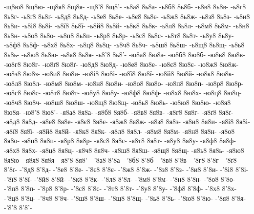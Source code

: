 {-щ8ю8
8щ8ю-
-щ8я8
8щ8я-
-щ8'8
8щ8'-
-ь8а8
8ь8а-
-ь8б8
8ь8б-
-ь8в8
8ь8в-
-ь8г8
8ь8г-
-ь8ґ8
8ь8ґ-
-ь8д8
8ь8д-
-ь8е8
8ь8е-
-ь8є8
8ь8є-
-ь8ж8
8ь8ж-
-ь8з8
8ь8з-
-ь8и8
8ь8и-
-ь8і8
8ь8і-
-ь8ї8
8ь8ї-
-ь8й8
8ь8й-
-ь8к8
8ь8к-
-ь8л8
8ь8л-
-ь8м8
8ь8м-
-ь8н8
8ь8н-
-ь8о8
8ь8о-
-ь8п8
8ь8п-
-ь8р8
8ь8р-
-ь8с8
8ь8с-
-ь8т8
8ь8т-
-ь8у8
8ь8у-
-ь8ф8
8ь8ф-
-ь8х8
8ь8х-
-ь8ц8
8ь8ц-
-ь8ч8
8ь8ч-
-ь8ш8
8ь8ш-
-ь8щ8
8ь8щ-
-ь8ь8
8ь8ь-
-ь8ю8
8ь8ю-
-ь8я8
8ь8я-
-ь8'8
8ь8'-
-ю8а8
8ю8а-
-ю8б8
8ю8б-
-ю8в8
8ю8в-
-ю8г8
8ю8г-
-ю8ґ8
8ю8ґ-
-ю8д8
8ю8д-
-ю8е8
8ю8е-
-ю8є8
8ю8є-
-ю8ж8
8ю8ж-
-ю8з8
8ю8з-
-ю8и8
8ю8и-
-ю8і8
8ю8і-
-ю8ї8
8ю8ї-
-ю8й8
8ю8й-
-ю8к8
8ю8к-
-ю8л8
8ю8л-
-ю8м8
8ю8м-
-ю8н8
8ю8н-
-ю8о8
8ю8о-
-ю8п8
8ю8п-
-ю8р8
8ю8р-
-ю8с8
8ю8с-
-ю8т8
8ю8т-
-ю8у8
8ю8у-
-ю8ф8
8ю8ф-
-ю8х8
8ю8х-
-ю8ц8
8ю8ц-
-ю8ч8
8ю8ч-
-ю8ш8
8ю8ш-
-ю8щ8
8ю8щ-
-ю8ь8
8ю8ь-
-ю8ю8
8ю8ю-
-ю8я8
8ю8я-
-ю8'8
8ю8'-
-я8а8
8я8а-
-я8б8
8я8б-
-я8в8
8я8в-
-я8г8
8я8г-
-я8ґ8
8я8ґ-
-я8д8
8я8д-
-я8е8
8я8е-
-я8є8
8я8є-
-я8ж8
8я8ж-
-я8з8
8я8з-
-я8и8
8я8и-
-я8і8
8я8і-
-я8ї8
8я8ї-
-я8й8
8я8й-
-я8к8
8я8к-
-я8л8
8я8л-
-я8м8
8я8м-
-я8н8
8я8н-
-я8о8
8я8о-
-я8п8
8я8п-
-я8р8
8я8р-
-я8с8
8я8с-
-я8т8
8я8т-
-я8у8
8я8у-
-я8ф8
8я8ф-
-я8х8
8я8х-
-я8ц8
8я8ц-
-я8ч8
8я8ч-
-я8ш8
8я8ш-
-я8щ8
8я8щ-
-я8ь8
8я8ь-
-я8ю8
8я8ю-
-я8я8
8я8я-
-я8'8
8я8'-
-'8а8
8'8а-
-'8б8
8'8б-
-'8в8
8'8в-
-'8г8
8'8г-
-'8ґ8
8'8ґ-
-'8д8
8'8д-
-'8е8
8'8е-
-'8є8
8'8є-
-'8ж8
8'8ж-
-'8з8
8'8з-
-'8и8
8'8и-
-'8і8
8'8і-
-'8ї8
8'8ї-
-'8й8
8'8й-
-'8к8
8'8к-
-'8л8
8'8л-
-'8м8
8'8м-
-'8н8
8'8н-
-'8о8
8'8о-
-'8п8
8'8п-
-'8р8
8'8р-
-'8с8
8'8с-
-'8т8
8'8т-
-'8у8
8'8у-
-'8ф8
8'8ф-
-'8х8
8'8х-
-'8ц8
8'8ц-
-'8ч8
8'8ч-
-'8ш8
8'8ш-
-'8щ8
8'8щ-
-'8ь8
8'8ь-
-'8ю8
8'8ю-
-'8я8
8'8я-
-'8'8
8'8'-
}
